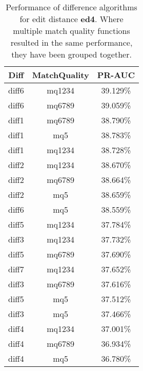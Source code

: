 \begin{table}[tbph]
\begin{center}
\begin{tabular}{|c|c||c|}
\hline
Diff & MatchQuality & PR-AUC  \\
\hline
\hline
diff6 & mq1234 & 39.129\% \\
diff6 & mq6789 & 39.059\% \\
diff1 & mq6789 & 38.790\% \\
diff1 & mq5 & 38.783\% \\
diff1 & mq1234 & 38.728\% \\
diff2 & mq1234 & 38.670\% \\
diff2 & mq6789 & 38.664\% \\
diff2 & mq5 & 38.659\% \\
diff6 & mq5 & 38.559\% \\
diff5 & mq1234 & 37.784\% \\
diff3 & mq1234 & 37.732\% \\
diff5 & mq6789 & 37.690\% \\
diff7 & mq1234 & 37.652\% \\
diff3 & mq6789 & 37.616\% \\
diff5 & mq5 & 37.512\% \\
diff3 & mq5 & 37.466\% \\
diff4 & mq1234 & 37.001\% \\
diff4 & mq6789 & 36.934\% \\
diff4 & mq5 & 36.780\% \\
\hline
\end{tabular}
\end{center}
\caption{Performance of difference algorithms for
  edit distance \textbf{ed4}.  Where multiple match
  quality functions resulted in the same performance, they
  have been grouped together.}
\label{tab:editlongbyed4}
\end{table}
